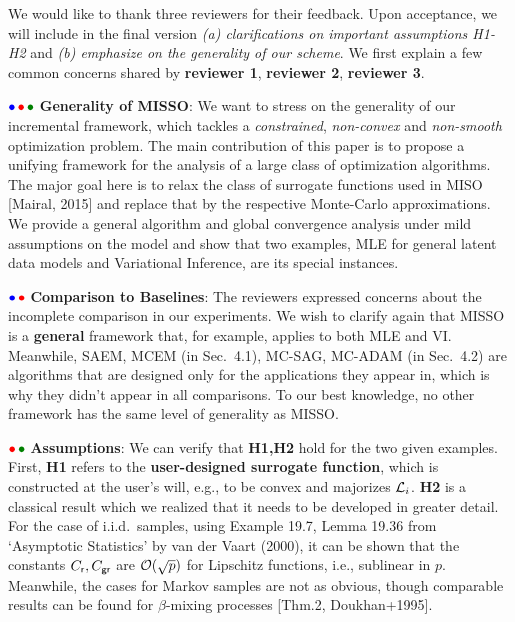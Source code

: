 \documentclass{article}
\begin{document}
We would like to thank three reviewers for their feedback. Upon acceptance, we will include in the final version \emph{{\sf (a)} clarifications on important assumptions H1-H2} and \emph{{\sf (b)} emphasize on the generality of our scheme}. We first explain a few common concerns shared by \textbf{\color{blue}reviewer 1}, \textbf{\color{red} reviewer 2}, \textbf{\color{green!50!black}reviewer 3}.

${\color{blue}\bullet}\!~{\color{red}\bullet}\!~{\color{green!50!black}\bullet}$ \textbf{Generality of MISSO}: We want to stress on the generality of our incremental framework, which tackles a \emph{constrained}, \emph{non-convex} and \emph{non-smooth} optimization problem. The main contribution of this paper is to propose a unifying framework for the analysis of a large class of optimization algorithms. 
The major goal here is to relax the class of surrogate functions used in MISO [Mairal, 2015] and replace that by the respective Monte-Carlo approximations.
We provide a general algorithm and global convergence analysis under mild assumptions on the model and show that two examples, MLE for general latent data models and Variational Inference, are its special instances.


${\color{blue}\bullet}\!~{\color{red}\bullet}$ \textbf{Comparison to Baselines}: The reviewers expressed concerns about the incomplete comparison in our experiments. We wish to clarify again that MISSO is a \textbf{general} framework that, for example, applies to both MLE and VI. Meanwhile, SAEM, MCEM (in Sec.~4.1), MC-SAG, MC-ADAM (in Sec.~4.2) are algorithms that are  designed only for the applications they appear in, which is why they didn't appear in all comparisons.
To our best knowledge, no other framework has the same level of generality as MISSO. 

${\color{red}\bullet}\!~{\color{green!50!black}\bullet}$ \textbf{Assumptions}: We can verify that \textbf{H1,H2} hold for the two given examples. First, \textbf{H1} refers to the \textbf{user-designed surrogate function}, which is  constructed at the user's will, e.g., to be convex and majorizes ${\cal L}_i$.  \textbf{H2} is a classical result which we realized that it needs to be
developed in greater detail. For the case of i.i.d.~samples, using Example 19.7, Lemma 19.36 from `Asymptotic Statistics' by van der Vaart (2000), it can be shown that the constants $C_{\sf r}, C_{\sf gr}$ are ${\cal O}(\sqrt{p})$ for Lipschitz functions, i.e., sublinear in $p$. Meanwhile, the cases for Markov samples are not as obvious, though comparable results can be found for $\beta$-mixing processes [Thm.2, Doukhan+1995]. 
\end{document}
